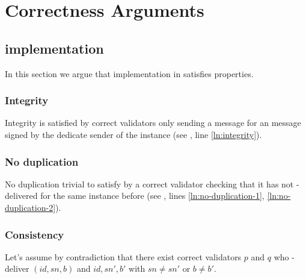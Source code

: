 \section{Correctness Arguments}
\label{sec:guarantees}
\subsection{\primitive implementation}
\label{sec:log-correctness}
In this section we argue that \primitive implementation in  satisfies \primitive properties.
\subsubsection{Integrity}
\label{sec:bbca-integrity}
Integrity is satisfied 
by correct validators only sending a \echo message for an \initiate message signed by the dedicate sender of the instance
(see , line \ref{ln:integrity}).

\subsubsection{No duplication}
\label{sec:bbca-no-duplication}
No duplication trivial to satisfy by a correct validator checking that it has not \primitivesmall-delivered for the same instance before (see , lines \ref{ln:no-duplication-1}, \ref{ln:no-duplication-2}).
\subsubsection{Consistency}
\label{sec:bbca-consistency}
Let's assume by contradiction that there exist correct validators $p$ and $q$ who \primitivesmall-deliver $(id, sn, b)$ and $id, sn', b'$ with $sn\neq sn'$ or $b\neq b'$.

